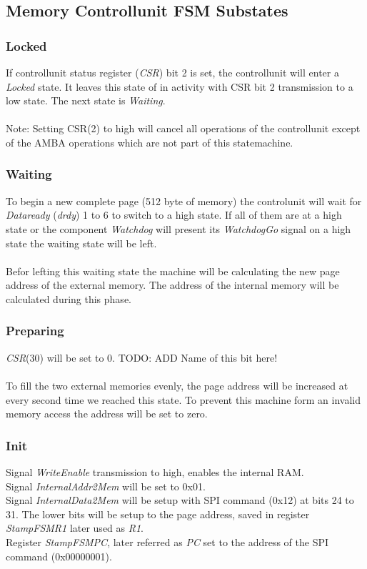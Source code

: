 \subsection{Memory Controllunit FSM Substates}
\subsubsection{Locked} 
If controllunit status register (\textit{CSR}) bit 2 is set, the controllunit will enter a \textit{Locked} state. It leaves this state of in activity with CSR bit 2 transmission to a low state. The next state is \textit{Waiting}. \\\\
Note: Setting CSR(2) to high will cancel all operations of the controllunit except of the AMBA operations which are not part of this statemachine. 
\subsubsection{Waiting} 
To begin a new complete page (512 byte of memory) the controlunit will wait for \textit{Dataready} (\textit{drdy}) 1 to 6 to switch to a high state. If all of them are at a high state or the component \textit{Watchdog} will present its \textit{WatchdogGo} signal on a high state the waiting state will be left. \\\\
Befor lefting this waiting state the machine will be calculating the new page address of the external memory. The address of the internal memory will be calculated during this phase. 
\subsubsection{Preparing} 
\textit{CSR}(30) will be set to 0. TODO: ADD Name of this bit here! \\\\
To fill the two external memories evenly, the page address will be increased at every second time we reached this state. To prevent this machine form an invalid memory access the address will be set to zero. 
\subsubsection{Init}
Signal \textit{WriteEnable} transmission to high, enables the internal RAM.\\
Signal \textit{InternalAddr2Mem} will be set to 0x01. \\
Signal \textit{InternalData2Mem} will be setup with SPI command (0x12) at bits 24 to 31. The lower bits will be setup to the page address, saved in register \textit{StampFSMR1} later used as \textit{R1}. \\
Register \textit{StampFSMPC}, later referred as \textit{PC} set to the address of the SPI command (0x00000001). 
